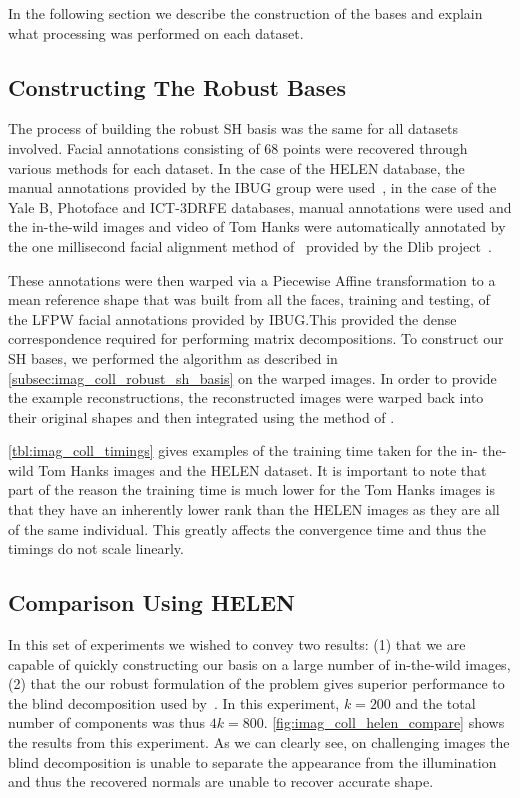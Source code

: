 In the following section we describe the construction of the bases and explain
what processing was performed on each dataset.
\subsection{Constructing The Robust Bases}\label{subsec:construction}
The process of building the robust SH basis was the same for all datasets
involved. Facial annotations consisting of 68 points were recovered through
various methods for each dataset. In the case of the HELEN database, the manual
annotations provided by the IBUG group were used~\cite{sagonas2013300,sagonas2013semi},
in the case of the Yale B, Photoface and ICT-3DRFE databases, manual annotations
were used and the in-the-wild images and video of Tom Hanks were automatically
annotated by the one millisecond facial alignment method of~\cite{kazemi2014one}
provided by the Dlib project~\cite{king2009dlib}.

These annotations were then warped via a Piecewise Affine transformation to a
mean reference shape that was built from all the faces, training and testing, of
the LFPW facial annotations provided by IBUG.\@ This provided the dense
correspondence required for performing matrix decompositions. To construct our
SH bases, we performed the algorithm as described in
\cref{subsec:imag_coll_robust_sh_basis} on the warped images. In order to provide
the example reconstructions, the reconstructed images were warped back into
their original shapes and then integrated using the method of 
\citet{frankot1988method}.

\cref{tbl:imag_coll_timings} gives examples of the training time taken for the in-
the-wild Tom Hanks images and the HELEN dataset. It is important to note that
part of the reason the training time is much lower for the Tom Hanks images is
that they have an inherently lower rank than the HELEN images as they are all of
the same individual. This greatly affects the convergence time and thus the
timings do not scale linearly.
\subsection{Comparison Using HELEN}\label{subsec:experiments_helen}
In this set of experiments we wished to convey two results: (1) that we are
capable of quickly constructing our basis on a large number of in-the-wild
images, (2) that the our robust formulation of the problem gives superior
performance to the blind decomposition used by~\cite{KemelmacherShlizerman:2013iv}. In this
experiment, $k = 200$ and the total number of components was thus $4k = 800$.
\cref{fig:imag_coll_helen_compare} shows the results from this experiment. As we can
clearly see, on challenging images the blind decomposition is unable to separate
the appearance from the illumination and thus the recovered normals are unable
to recover accurate shape.
